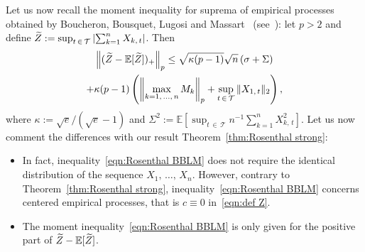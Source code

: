 \documentclass[10pt]{amsart}
\theoremstyle{definition}\newtheorem{defi}[theo]{Definition}\newtheorem{rema}[theo]{Remark}\newtheorem{exam}[theo]{Example}\newtheorem{exem}[theo]{Example}\newtheorem{nota}[theo]{Notation}
\newcommand{\bE}{\mathbb{E}}
\newcommand{\cT}{\mathcal{T}}
\let\oldtilde\tilde
\renewcommand*{\tilde}[1]{\mathchoice{\widetilde{#1}}{\widetilde{#1}}{\oldtilde{#1}}{\oldtilde{#1}}}
\begin{document}
Let us now recall the moment inequality for suprema of empirical processes obtained by Boucheron, Bousquet, Lugosi and Massart~\cite{BBLM05} (see~\cite[Theorems~15.14 and 15.5]{BLM13}): let $p>2$ and define $\tilde Z:=\sup_{t\,\in\,\cT}\left|\sum_{k=1}^nX_{k,\,t}\right|$. Then
\begin{multline}\label{eqn:Rosenthal BBLM}
\left\|(\tilde Z-\bE[\tilde Z])_+\right\|_p\leq \sqrt{\kappa(p-1)}\sqrt{n}\left(\sigma+\Sigma\right)\\
+\kappa(p-1)\left(\left\|\max_{k=1,\,\ldots,\,n}M_k\right\|_p+\sup_{t\,\in\,\cT}\|X_{1,\,t}\|_2\right),
\end{multline}
where $\kappa:=\sqrt{e}/(\sqrt{e}-1)$ and $\Sigma^2:=\bE[\sup_{t\,\in\,\cT}n^{-1}\sum_{k=1}^nX_{k,\,t}^2]$. Let us now comment the differences with our result Theorem~\ref{thm:Rosenthal strong}:
\begin{itemize}
\item In fact, inequality~\eqref{eqn:Rosenthal BBLM} does not require the identical distribution of the sequence $X_1,\,\ldots,\,X_n$. However, contrary to Theorem~\ref{thm:Rosenthal strong}, inequality~\eqref{eqn:Rosenthal BBLM} concerns centered empirical processes, that is $c\equiv 0$ in~\eqref{eqn:def Z}.
\item The moment inequality~\eqref{eqn:Rosenthal BBLM} is only given for the positive part of $\tilde Z-\bE[\tilde Z]$.


\end{itemize}
\end{document}
